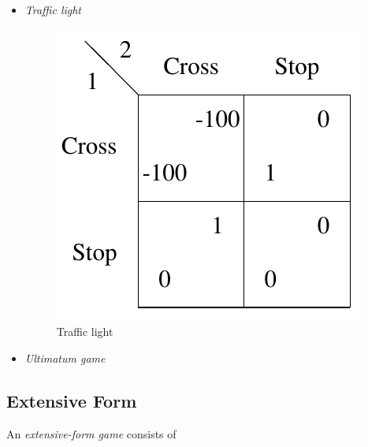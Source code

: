 \begin{itemize}
  \item \emph{Traffic light}

    \begin{figure}
      \centering
      \includegraphics[width=\widthratio\paperwidth]{../img/traffic-light.png}
      \caption{Traffic light}
      \label{fig:traffic-light}
    \end{figure}

  \item \emph{Ultimatum game}
\end{itemize}

\subsection{Extensive Form}
\label{ssec:extensive-form}

An \emph{extensive-form game} consists of

